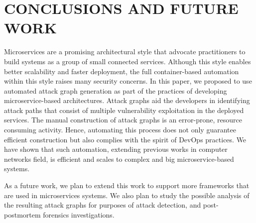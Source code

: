 \section{CONCLUSIONS AND FUTURE WORK}
\label{chap:conclusion}

Microservices are a promising architectural style that advocate practitioners to build systems as a group of small connected  services. Although this style enables better scalability and faster deployment, the full container-based automation within this style raises many security concerns. In this paper, we proposed to use automated attack graph generation as part of the practices of developing microservice-based architectures. Attack graphs aid the developers in identifying attack paths that consist of multiple vulnerability exploitation in the deployed services. The manual construction of attack graphs is an error-prone, resource consuming activity. Hence, automating this process does not only guarantee efficient construction but also complies with the spirit of DevOps practices. We have shown that such automation, extending previous works in computer networks field, is efficient and scales to complex and big microservice-based systems. 

As a future work, we plan to extend this work to support more frameworks that are used in microservices systems. We also plan to study the possible analysis of the resulting attack graphs for purposes of attack detection, and post-postmortem forensics investigations. 